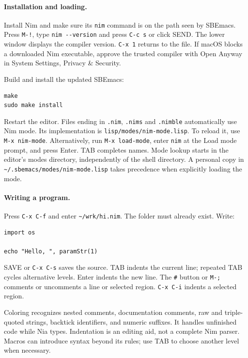 \documentclass[a4paper,12pt,openany]{book}
\begin{document}
\paragraph{Installation and loading.}
Install Nim and make sure its \verb|nim| command is on the path seen by
SBEmacs. Press \verb|M-!|, type \verb|nim --version| and press
\verb|C-c s| or click SEND. The lower window displays the compiler
version. \verb|C-x 1| returns to the file. If macOS blocks a downloaded
Nim executable, approve the trusted compiler with Open Anyway in System
Settings, Privacy \& Security.

Build and install the updated SBEmacs:
\begin{verbatim}
make
sudo make install
\end{verbatim}
Restart the editor. Files ending in \verb|.nim|, \verb|.nims| and
\verb|.nimble| automatically use Nim mode. Its implementation is
\verb|lisp/modes/nim-mode.lisp|. To reload it, use \verb|M-x nim-mode|.
Alternatively, run \verb|M-x load-mode|, enter \verb|nim| at the Load
mode prompt, and press Enter. TAB completes names. Mode lookup starts
in the editor's modes directory, independently of the shell directory.
A personal copy in \verb|~/.sbemacs/modes/nim-mode.lisp| takes precedence
when explicitly loading the mode.

\paragraph{Writing a program.}
Press \verb|C-x C-f| and enter \verb|~/wrk/hi.nim|. The folder must
already exist. Write:
\begin{verbatim}
import os

echo "Hello, ", paramStr(1)
\end{verbatim}
SAVE or \verb|C-x C-s| saves the source. TAB indents the current line;
repeated TAB cycles alternative levels. Enter indents the new line.
The \verb|#| button or \verb|M-;| comments or uncomments a line or
selected region. \verb|C-x C-i| indents a selected region.

Coloring recognizes nested comments, documentation comments, raw and
triple-quoted strings, backtick identifiers, and numeric suffixes. It
handles unfinished code while Nia types. Indentation is an editing aid,
not a complete Nim parser. Macros can introduce syntax beyond its rules;
use TAB to choose another level when necessary.
\end{document}
